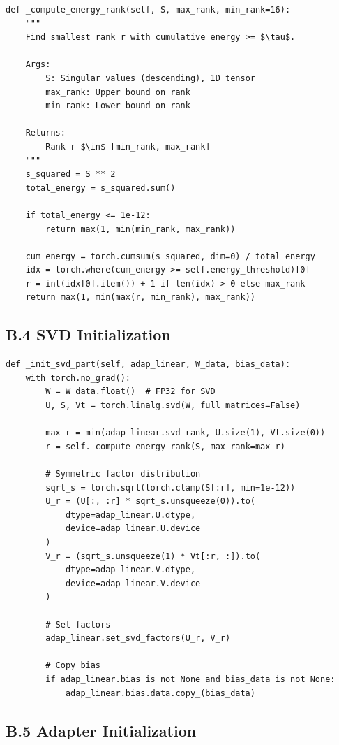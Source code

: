 \begin{lstlisting}
def _compute_energy_rank(self, S, max_rank, min_rank=16):
    """
    Find smallest rank r with cumulative energy >= $\tau$.
    
    Args:
        S: Singular values (descending), 1D tensor
        max_rank: Upper bound on rank
        min_rank: Lower bound on rank
    
    Returns:
        Rank r $\in$ [min_rank, max_rank]
    """
    s_squared = S ** 2
    total_energy = s_squared.sum()
    
    if total_energy <= 1e-12:
        return max(1, min(min_rank, max_rank))
    
    cum_energy = torch.cumsum(s_squared, dim=0) / total_energy
    idx = torch.where(cum_energy >= self.energy_threshold)[0]
    r = int(idx[0].item()) + 1 if len(idx) > 0 else max_rank
    return max(1, min(max(r, min_rank), max_rank))
\end{lstlisting}

\subsection{B.4 SVD Initialization}

\begin{lstlisting}
def _init_svd_part(self, adap_linear, W_data, bias_data):
    with torch.no_grad():
        W = W_data.float()  # FP32 for SVD
        U, S, Vt = torch.linalg.svd(W, full_matrices=False)
        
        max_r = min(adap_linear.svd_rank, U.size(1), Vt.size(0))
        r = self._compute_energy_rank(S, max_rank=max_r)
        
        # Symmetric factor distribution
        sqrt_s = torch.sqrt(torch.clamp(S[:r], min=1e-12))
        U_r = (U[:, :r] * sqrt_s.unsqueeze(0)).to(
            dtype=adap_linear.U.dtype,
            device=adap_linear.U.device
        )
        V_r = (sqrt_s.unsqueeze(1) * Vt[:r, :]).to(
            dtype=adap_linear.V.dtype,
            device=adap_linear.V.device
        )
        
        # Set factors
        adap_linear.set_svd_factors(U_r, V_r)
        
        # Copy bias
        if adap_linear.bias is not None and bias_data is not None:
            adap_linear.bias.data.copy_(bias_data)
\end{lstlisting}

\subsection{B.5 Adapter Initialization}

